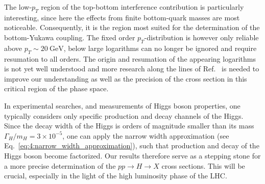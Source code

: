 The low-$p_T$ region of the top-bottom interference contribution is particularly interesting, since here the effects from finite bottom-quark masses are most noticeable. Consequently, it is the region most suited for the determination of the bottom-Yukawa coupling. The fixed order $p_T$-distribution is however only reliable above $p_T \sim 20 \ \mathrm{GeV}$, below large logarithms can no longer be ignored and require resumation to all orders. The origin and resumation of the appearing logarithms is not yet well understood and more research along the lines of Ref.~\cite{Caola:2018zye} is needed to improve our understanding as well as the precision of the cross section in this critical region of the phase space.

In experimental searches, and measurements of Higgs boson properties, one typically considers only specific production and decay channels of the Higgs. Since the decay width of the Higgs is orders of magnitude smaller than its mass $\Gamma_H /m_H = 3 \times 10^{-5}$, one can apply the narrow width approximation (see Eq.~\eqref{eq:4:narrow_width_approximation}), such that production and decay of the Higgs boson become factorized. Our results therefore serve as a stepping stone for a more precise determination of the $pp \rightarrow H \rightarrow X$ cross sections. This will be crucial, especially in the light of the high luminosity phase of the \acs{LHC}.